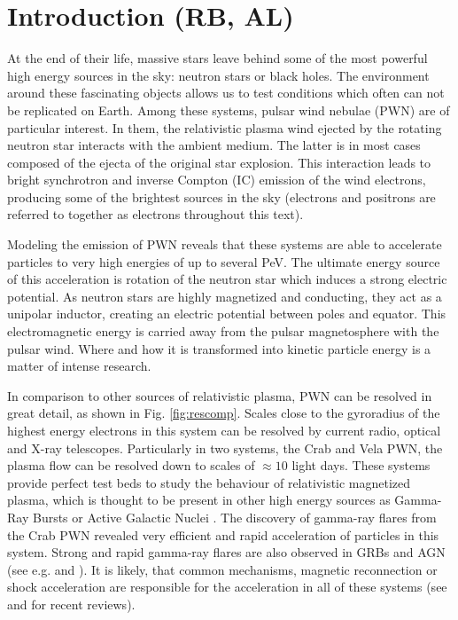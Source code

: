 \section{Introduction (RB, AL)}
At the end of their life, massive stars leave behind some of the most powerful high energy sources in the sky: neutron stars or black holes. The environment around these fascinating objects allows
us to test conditions which often can not be replicated on Earth. Among these systems, pulsar wind nebulae (PWN) are of particular interest. In them, the relativistic plasma wind ejected by the rotating neutron star interacts with the ambient medium. The latter is in most cases composed of the ejecta of the original star explosion. This interaction leads to bright synchrotron and inverse Compton (IC) emission of the wind electrons, producing some of the brightest sources in the sky (electrons and positrons are referred to together as electrons throughout this text).

Modeling the emission of PWN reveals that these systems are able to accelerate particles to very high energies of up to several PeV. The ultimate energy source of this acceleration is rotation of the neutron star which induces a strong electric potential. As neutron stars are highly magnetized and conducting, they act as a unipolar inductor, creating an electric potential between poles and equator. This electromagnetic energy is carried away from the pulsar magnetosphere with the pulsar wind. Where and how it is transformed into kinetic particle energy is a matter of intense research.

In comparison to other sources of relativistic plasma, PWN can be resolved in great detail, as shown in Fig. \ref{fig:rescomp}. Scales close to the gyroradius of the highest energy electrons in this system can be resolved by current radio, optical and X-ray telescopes. Particularly in two systems, the Crab and Vela PWN, the plasma flow can be resolved down to scales of $\approx 10$ light days. These systems provide perfect test beds to study the behaviour of relativistic magnetized plasma, which is thought to be present in other high energy sources as Gamma-Ray Bursts or Active Galactic Nuclei \citep{Berger_2014,Massaro_2015}. The discovery of gamma-ray flares from the Crab PWN revealed very efficient and rapid acceleration of particles in this system. Strong and rapid gamma-ray flares are also observed in GRBs and AGN (see e.g. \citep{Ackermann_2013} and \citep{Aharonian_2009}). It is likely, that common mechanisms, magnetic reconnection or shock acceleration are responsible for the acceleration in all of these systems (see \citep{Kagan_2015} and \citep{Sironi_2015} for recent reviews).

